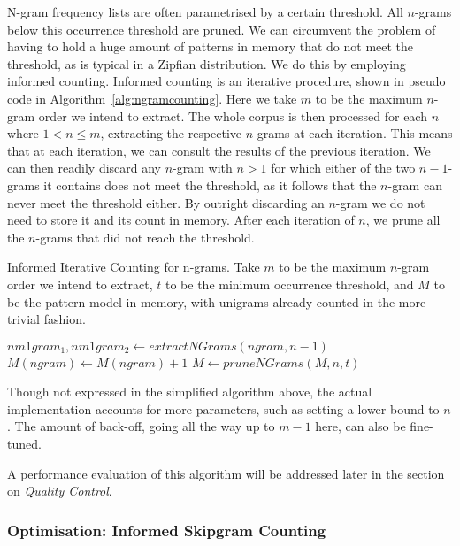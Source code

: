 \documentclass[a4paper,12pt]{article}
\begin{document}
N-gram frequency lists are often parametrised by a certain threshold. All
$n$-grams below this occurrence threshold are pruned. We can circumvent the
problem of having to hold a huge amount of patterns in memory that do not meet
the threshold, as is typical in a Zipfian distribution. We do this by employing
informed counting. Informed counting is an iterative procedure, shown in pseudo
code in Algorithm~\ref{alg:ngramcounting}. Here we take $m$ to be the maximum
$n$-gram order we intend to extract. The whole corpus is then processed for
each $n$ where $1<n\leq m$, extracting the respective $n$-grams at each
iteration. This means that at each iteration, we can consult the results of the
previous iteration. We can then readily discard any $n$-gram with $n>1$ for
which either of the two $n-1$-grams it contains does not
meet the threshold, as it follows that the $n$-gram can never meet the
threshold either. By outright discarding an $n$-gram we do not need to store it
and its count in memory. After each iteration of $n$, we prune all the
$n$-grams that did not reach the threshold.


\begin{algorithm} \caption{Informed Iterative Counting for n-grams.  Take $m$
to be the maximum $n$-gram order we intend to extract, $t$ to be the minimum occurrence threshold, and $M$ to be the
pattern model in memory, with unigrams already counted in the more trivial fashion.}
\label{alg:ngramcounting}
\begin{algorithmic}
            \State  $nm1gram_1, nm1gram_2 \leftarrow extractNGrams(ngram,n-1)$
                \State $M(ngram) \leftarrow M(ngram) + 1$
            \EndIf
        \EndFor 
    \EndFor
    \State $M \leftarrow pruneNGrams(M,n,t)$
\EndFor \\
\end{algorithmic}
\end{algorithm}

Though not expressed in the simplified algorithm above, the actual
implementation accounts for more parameters, such as setting a lower bound to
$n$. The amount of back-off, going all the way up to $m-1$ here, can also be
fine-tuned.

A performance evaluation of this algorithm will be addressed later in the
section on \emph{Quality Control}.

\subsubsection{Optimisation: Informed Skipgram Counting}
\label{sec:skipgramcount}
\end{document}
